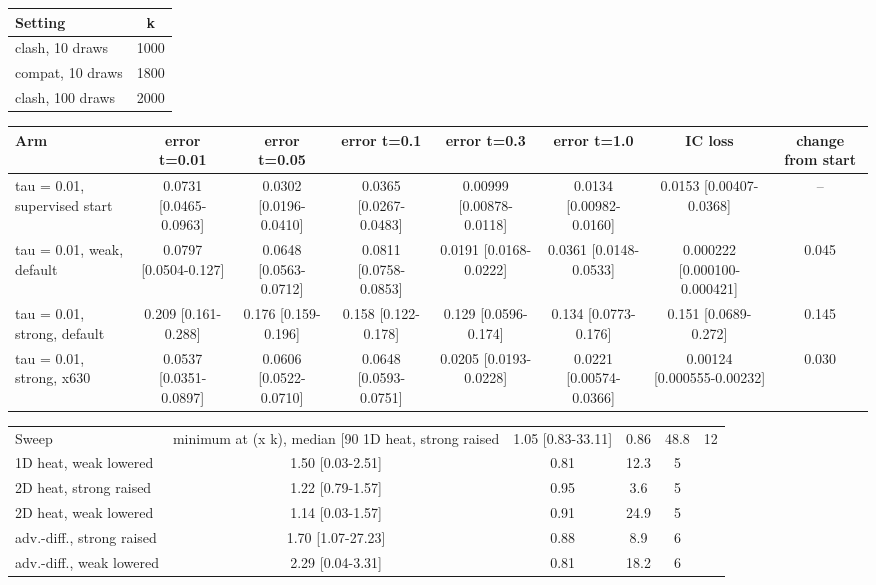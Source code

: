 \begin{tabular}{lc}
\toprule
Setting & k \\
\midrule
clash, 10 draws & 1000 \\
compat, 10 draws & 1800 \\
clash, 100 draws & 2000 \\
\bottomrule
\end{tabular}

\begin{tabular}{lccccccc}
\toprule
Arm & error t=0.01 & error t=0.05 & error t=0.1 & error t=0.3 & error t=1.0 & IC loss & change from start \\
\midrule
tau = 0.01, supervised start & 0.0731 {\scriptsize[0.0465-0.0963]} & 0.0302 {\scriptsize[0.0196-0.0410]} & 0.0365 {\scriptsize[0.0267-0.0483]} & 0.00999 {\scriptsize[0.00878-0.0118]} & 0.0134 {\scriptsize[0.00982-0.0160]} & 0.0153 {\scriptsize[0.00407-0.0368]} & -- \\
tau = 0.01, weak, default & 0.0797 {\scriptsize[0.0504-0.127]} & 0.0648 {\scriptsize[0.0563-0.0712]} & 0.0811 {\scriptsize[0.0758-0.0853]} & 0.0191 {\scriptsize[0.0168-0.0222]} & 0.0361 {\scriptsize[0.0148-0.0533]} & 0.000222 {\scriptsize[0.000100-0.000421]} & 0.045 \\
tau = 0.01, strong, default & 0.209 {\scriptsize[0.161-0.288]} & 0.176 {\scriptsize[0.159-0.196]} & 0.158 {\scriptsize[0.122-0.178]} & 0.129 {\scriptsize[0.0596-0.174]} & 0.134 {\scriptsize[0.0773-0.176]} & 0.151 {\scriptsize[0.0689-0.272]} & 0.145 \\
tau = 0.01, strong, x630 & 0.0537 {\scriptsize[0.0351-0.0897]} & 0.0606 {\scriptsize[0.0522-0.0710]} & 0.0648 {\scriptsize[0.0593-0.0751]} & 0.0205 {\scriptsize[0.0193-0.0228]} & 0.0221 {\scriptsize[0.00574-0.0366]} & 0.00124 {\scriptsize[0.000555-0.00232]} & 0.030 \\
\bottomrule
\end{tabular}

\begin{tabular}{lcccc}
\toprule
Sweep & minimum at (x k), median [90%
\midrule
1D heat, strong raised & 1.05 {\scriptsize[0.83-33.11]} & 0.86 & 48.8 & 12 \\
1D heat, weak lowered & 1.50 {\scriptsize[0.03-2.51]} & 0.81 & 12.3 & 5 \\
2D heat, strong raised & 1.22 {\scriptsize[0.79-1.57]} & 0.95 & 3.6 & 5 \\
2D heat, weak lowered & 1.14 {\scriptsize[0.03-1.57]} & 0.91 & 24.9 & 5 \\
adv.-diff., strong raised & 1.70 {\scriptsize[1.07-27.23]} & 0.88 & 8.9 & 6 \\
adv.-diff., weak lowered & 2.29 {\scriptsize[0.04-3.31]} & 0.81 & 18.2 & 6 \\
\bottomrule
\end{tabular}

